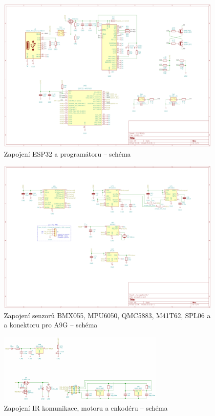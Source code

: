 \begin{figure}[htbp]
    \centering
    \includegraphics[width=\textwidth]{kapitoly/ctvrta_elektronicka_varianta/E4_zapojeni/ESP32.pdf}
    \caption{Zapojení ESP32 a programátoru -- schéma}
    \label{fig:E4-sch_ESP32}
\end{figure}
\begin{figure}[htbp]
    \centering
    \includegraphics[width=\textwidth]{kapitoly/ctvrta_elektronicka_varianta/E4_zapojeni/senzorika.pdf}
    \caption{Zapojení senzorů BMX055, MPU6050, QMC5883, M41T62, SPL06 a a konektoru pro A9G -- schéma}
    \label{fig:E4-sch_senzorika}
\end{figure}
\begin{figure}[htbp]
    \centering
    \includegraphics[width=\textwidth]{kapitoly/ctvrta_elektronicka_varianta/E4_zapojeni/IR_motor_enkoder.pdf}
    \caption{Zapojení IR komunikace, motoru a enkodéru -- schéma}
    \label{fig:E4-sch_IR-Motor-enkoder}
\end{figure}
